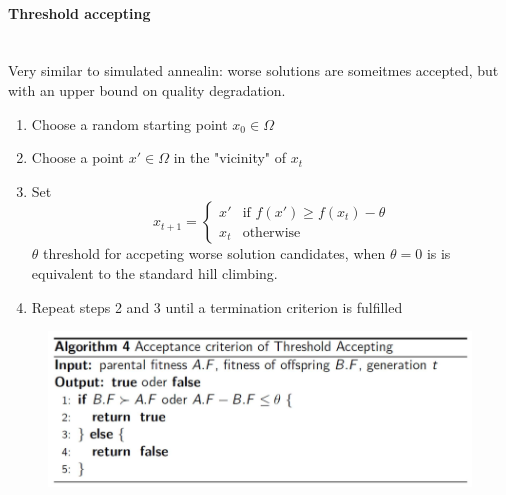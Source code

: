 \documentclass{article}
\begin{document}
\paragraph{Threshold accepting}\mbox{}\\
Very similar to simulated annealin: worse solutions are someitmes accepted, but with an upper bound
on quality degradation.
\begin{enumerate}
    \item Choose a random starting point $x_0\in\Omega$
    \item Choose a point $x'\in\Omega$ in the "vicinity" of $x_t$
    \item Set
          \[
              x_{t+1}=
              \begin{cases}
                  x'  & \text{if }f(x')\geq f(x_t)-\theta \\
                  x_t & \text{otherwise}
              \end{cases}
          \]
          $\theta$ threshold for accpeting worse solution candidates, when $\theta=0$ is is equivalent
          to the standard hill climbing.
    \item Repeat steps 2 and 3 until a termination criterion is fulfilled
\end{enumerate}

\begin{figure}[H]
    \centering
    \includegraphics[scale=0.5]{images/threshold-accept.png}
\end{figure}
\end{document}
